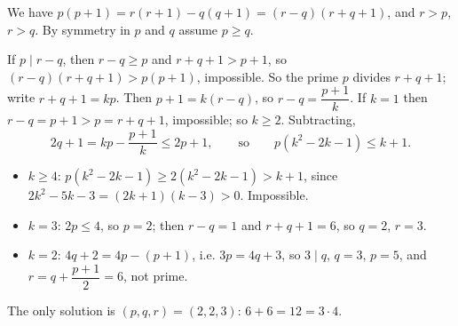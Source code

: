 We have $p(p+1)=r(r+1)-q(q+1)=(r-q)(r+q+1)$, and $r>p$, $r>q$. By symmetry in $p$ and $q$ assume $p\ge q$.

If $p\mid r-q$, then $r-q\ge p$ and $r+q+1>p+1$, so $(r-q)(r+q+1)>p(p+1)$, impossible. So the prime $p$ divides $r+q+1$; write $r+q+1=kp$. Then $p+1=k(r-q)$, so $r-q=\dfrac{p+1}{k}$. If $k=1$ then $r-q=p+1>p=r+q+1$, impossible; so $k\ge2$. Subtracting,
\[2q+1=kp-\dfrac{p+1}{k}\le2p+1,\qquad\text{so}\qquad p\left(k^2-2k-1\right)\le k+1.\]
\begin{itemize}
\item $k\ge4$: $p\left(k^2-2k-1\right)\ge2\left(k^2-2k-1\right)>k+1$, since $2k^2-5k-3=(2k+1)(k-3)>0$. Impossible.
\item $k=3$: $2p\le4$, so $p=2$; then $r-q=1$ and $r+q+1=6$, so $q=2$, $r=3$.
\item $k=2$: $4q+2=4p-(p+1)$, i.e. $3p=4q+3$, so $3\mid q$, $q=3$, $p=5$, and $r=q+\dfrac{p+1}{2}=6$, not prime.
\end{itemize}
The only solution is $\boxed{(p,q,r)=(2,2,3)}$: $6+6=12=3\cdot4$.

